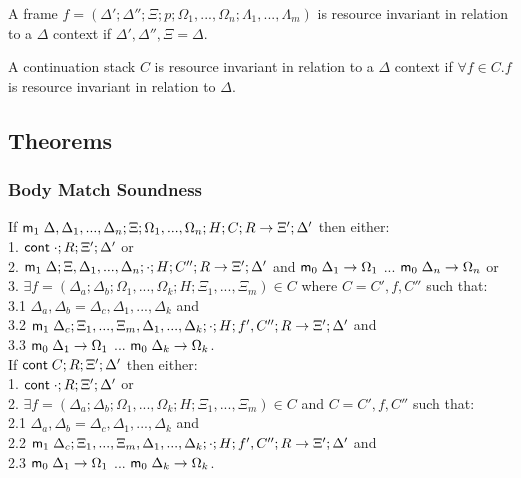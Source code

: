 A frame $f = (\Delta'; \Delta''; \Xi; p; \Omega_1, ..., \Omega_n; \Lambda_1, ..., \Lambda_m)$ is resource invariant in relation to a $\Delta$ context if $\Delta', \Delta'', \Xi = \Delta$.

A continuation stack $C$ is resource invariant in relation to a $\Delta$ context if $\forall f \in C. f$ is resource invariant in relation to $\Delta$.

\subsection{Theorems}

\subsubsection{Body Match Soundness}

If $\mathsf{m}_1 \; \Delta, \Delta_1, ..., \Delta_n; \Xi; \Omega_1, ..., \Omega_n; H; C; R \rightarrow \Xi'; \Delta'$ then either:\\
1. \hspace{1cm} $\mathsf{cont} \; \cdot; R; \Xi'; \Delta'$ or \\
2. \hspace{1cm} $\mathsf{m}_1 \; \Delta; \Xi, \Delta_1, ..., \Delta_n; \cdot; H; C''; R \rightarrow \Xi'; \Delta'$ and $\mathsf{m}_0 \; \Delta_1 \rightarrow \Omega_1$ ... $\mathsf{m}_0 \; \Delta_n \rightarrow \Omega_n$ or \\
3. \hspace{1cm} $\exists f = (\Delta_a; \Delta_b; \Omega_1, ..., \Omega_k; H; \Xi_1, ..., \Xi_m) \in C$ where $C = C', f, C''$ such that:\\
3.1 \hspace{2cm} $\Delta_a, \Delta_b = \Delta_c, \Delta_1, ..., \Delta_k$ and \\
3.2 \hspace{2cm} $\mathsf{m}_1 \; \Delta_c; \Xi_1, ..., \Xi_m, \Delta_1, ..., \Delta_k; \cdot; H; f', C''; R \rightarrow \Xi'; \Delta'$ and \\
3.3 \hspace{2cm} $\mathsf{m}_0 \; \Delta_1 \rightarrow \Omega_1$ ... $\mathsf{m}_0 \; \Delta_k \rightarrow \Omega_k$.\\

If $\mathsf{cont} \; C; R; \Xi'; \Delta'$ then either:\\
1. \hspace{1cm} $\mathsf{cont} \; \cdot; R; \Xi'; \Delta'$ or \\
2. \hspace{1cm} $\exists f = (\Delta_a; \Delta_b; \Omega_1, ..., \Omega_k; H; \Xi_1, ..., \Xi_m) \in C$ and $C = C', f, C''$ such that:\\
2.1 \hspace{2cm} $\Delta_a, \Delta_b = \Delta_c, \Delta_1, ..., \Delta_k$ and \\
2.2 \hspace{2cm} $\mathsf{m}_1 \; \Delta_c; \Xi_1, ..., \Xi_m, \Delta_1, ..., \Delta_k; \cdot; H; f', C''; R \rightarrow \Xi'; \Delta'$ and \\
2.3 \hspace{2cm} $\mathsf{m}_0 \; \Delta_1 \rightarrow \Omega_1$ ... $\mathsf{m}_0 \; \Delta_k \rightarrow \Omega_k$.\\


